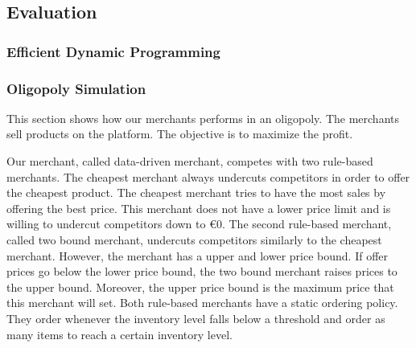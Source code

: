 
\subsection{Evaluation}
\subsubsection{Efficient Dynamic Programming}

\subsubsection{Oligopoly Simulation}
This section shows how our merchants performs in an oligopoly.
The merchants sell products on the \pricewars platform.
The objective is to maximize the profit.

Our merchant, called data-driven merchant, competes with two rule-based merchants.
The cheapest merchant always undercuts competitors in order to offer the cheapest product.
The cheapest merchant tries to have the most sales by offering the best price.
This merchant does not have a lower price limit and is willing to undercut competitors down to €0.
The second rule-based merchant, called two bound merchant, undercuts competitors similarly to the cheapest merchant.
However, the merchant has a upper and lower price bound.
If offer prices go below the lower price bound, the two bound merchant raises prices to the upper bound.
Moreover, the upper price bound is the maximum price that this merchant will set.
Both rule-based merchants have a static ordering policy.
They order whenever the inventory level falls below a threshold and order as many items to reach a certain inventory level.

